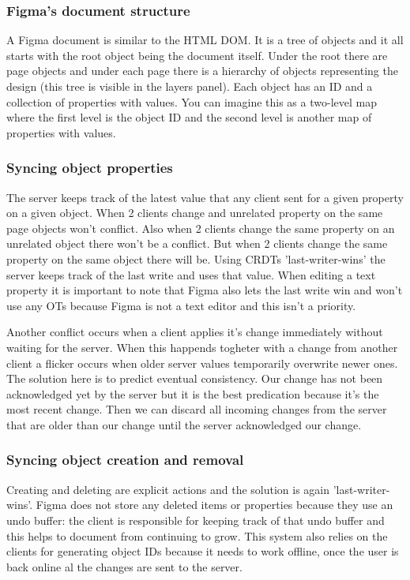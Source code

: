 \subsubsection*{Figma's document structure}

A Figma document is similar to the HTML DOM. It is a tree of objects and it all starts with the root object being the document itself. Under the root there are page objects and under each page there is a hierarchy of objects representing the design (this tree is visible in the layers panel). Each object has an ID and a collection of properties with values. You can imagine this as a two-level map where the first level is the object ID and the second level is another map of properties with values.

\subsubsection*{Syncing object properties}

The server keeps track of the latest value that any client sent for a given property on a given object. When 2 clients change and unrelated property on the same page objects won't conflict. Also when 2 clients change the same property on an unrelated object there won't be a conflict. But when 2 clients change the same property on the same object there will be. Using CRDTs 'last-writer-wins' the server keeps track of the last write and uses that value. When editing a text property it is important to note that Figma also lets the last write win and won't use any OTs because Figma is not a text editor and this isn't a priority.

Another conflict occurs when a client applies it's change immediately without waiting for the server. When this happends togheter with a change from another client a flicker occurs when older server values temporarily overwrite newer ones. The solution here is to predict eventual consistency. Our change has not been acknowledged yet by the server but it is the best predication because it's the most recent change. Then we can discard all incoming changes from the server that are older than our change until the server acknowledged our change.

\subsubsection*{Syncing object creation and removal}

Creating and deleting are explicit actions and the solution is again 'last-writer-wins'. Figma does not store any deleted items or properties because they use an undo buffer: the client is responsible for keeping track of that undo buffer and this helps to document from continuing to grow. This system also relies on the clients for generating object IDs because it needs to work offline, once the user is back online al the changes are sent to the server.

